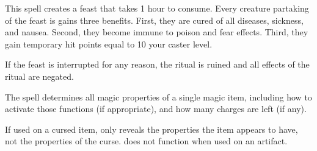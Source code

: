 \spellrng{\rngclose}
\begin{spelleffect}
This spell creates a feast that takes 1 hour to consume. Every creature partaking of the feast is gains three benefits. First, they are cured of all diseases, sickness, and nausea. Second, they become immune to poison and fear effects. Third, they gain temporary hit points equal to 10 \add your caster level.
\end{spelleffect}
\begin{spellnotes}
If the feast is interrupted for any reason, the ritual is ruined and all effects of the ritual are negated.
\end{spellnotes}

\begin{spelleffect}
The spell determines all magic properties of a single magic item, including how to activate those functions (if appropriate), and how many charges are left (if any).
\end{spelleffect}
\begin{spellnotes}
\par If used on a cursed item,  only reveals the properties the item appears to have, not the properties of the curse.  does not function when used on an artifact.
\end{spellnotes}

